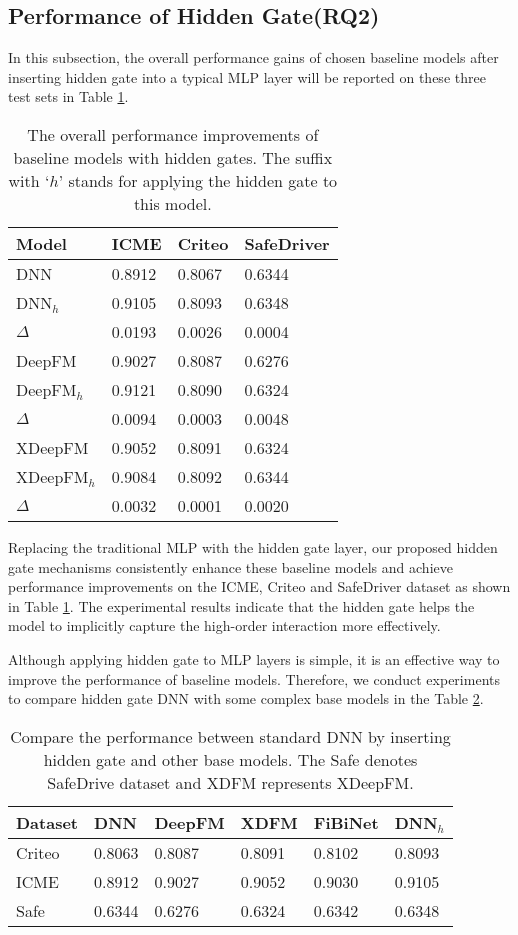 \documentclass[sigconf,nonacm=true]{acmart}
\begin{document}
\subsection{Performance of Hidden Gate(RQ2)}
In this subsection, the overall performance gains of chosen baseline models after inserting hidden gate into a typical MLP layer will be reported on these three test sets in Table \ref{table:t4}. 

\begin{table}[!htbp]
  \centering
  \caption{The overall performance improvements of baseline models with hidden gates. The suffix with `$h$' stands for applying the hidden gate to this model.}
  \label{table:t4}
  \begin{tabular}{llll}
  Model & ICME & Criteo & SafeDriver \\ \hline
  DNN & 0.8912 & 0.8067 & 0.6344 \\
  DNN$_h$  & 0.9105 & 0.8093 & 0.6348 \\
  $\Delta$ & 0.0193 & 0.0026 & 0.0004 \\ \hline
  DeepFM & 0.9027 & 0.8087 & 0.6276 \\
  DeepFM$_h$  & 0.9121 & 0.8090 & 0.6324 \\
  $\Delta$ & 0.0094 & 0.0003 & 0.0048 \\ \hline
  XDeepFM & 0.9052 & 0.8091 & 0.6324 \\
  XDeepFM$_h$  & 0.9084 & 0.8092 & 0.6344 \\
  $\Delta$ & 0.0032 & 0.0001 & 0.0020 \tabularnewline \bottomrule 
  \end{tabular}
\end{table}

Replacing the traditional MLP with the hidden gate layer, our proposed hidden gate mechanisms
consistently enhance these baseline models and achieve performance improvements on the ICME, Criteo and SafeDriver dataset as shown in Table \ref{table:t4}. The experimental results indicate that the hidden gate helps the model to implicitly capture the high-order interaction more effectively.

Although applying hidden gate to MLP layers is simple, it is an effective way to improve the performance of baseline models. 
Therefore, we conduct experiments to compare hidden gate DNN with some complex base models in the Table \ref{table:t41}.

\begin{table}[!htbp]
\centering
\caption{Compare the performance between standard DNN by inserting hidden gate and other base models. The Safe denotes SafeDrive dataset and XDFM represents XDeepFM.}
\label{table:t41}
\begin{tabular}{llllll}
Dataset  & DNN & DeepFM & XDFM & FiBiNet & DNN$_{h}$ \\ \hline
Criteo & 0.8063 & 0.8087 & 0.8091 & 0.8102 & 0.8093 \\
ICME  & 0.8912 & 0.9027 & 0.9052 & 0.9030 & 0.9105 \\
Safe  & 0.6344 & 0.6276 & 0.6324 & 0.6342 & 0.6348 \tabularnewline
  \bottomrule
\end{tabular}
\end{table}
\end{document}
